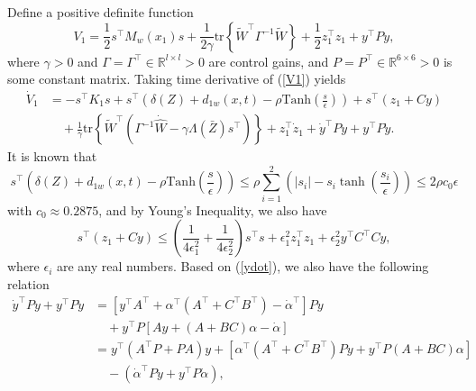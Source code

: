 \documentclass{article}
\newcommand{\tr}{\text{tr}}
\begin{document}
	Define a positive definite function
	\begin{equation}
	V_{1} = \frac{1}{2}s^{\top}M_{w}(x_{1})s + \frac{1}{2\gamma}\tr\left\{\tilde{W}^{\top}\Gamma^{-1}\tilde{W}\right\} + \frac{1}{2}z_{1}^{\top}z_{1} + y^{\top}Py, \label{V1}
	\end{equation}
	where $\gamma>0$ and $\Gamma = \Gamma^{\top}\in\mathbb{R}^{l\times l}>0$ are control gains, and $P=P^{\top}\in\mathbb{R}^{6\times 6}>0$ is some constant matrix. Taking time derivative of (\ref{V1}) yields
	\begin{align}
	\dot{V}_{1} &= -s^{\top}K_{1}s + s^{\top}\left(\delta\left(Z\right)+d_{1w}(x,t) - \rho\text{Tanh}\left(\frac{s}{\epsilon}\right)\right) + s^{\top}\left(z_{1}+Cy\right) \nonumber \\
	&\quad + \frac{1}{\gamma}\tr\left\{\tilde{W}^{\top}\left(\Gamma^{-1}\dot{\hat{W}}-\gamma\Lambda\left(\bar{Z}\right)s^{\top}\right)\right\} + z_{1}^{\top}\dot{z}_{1} + \dot{y}^{\top}Py + y^{\top}P\dot{y}. \label{V1dot1}
	\end{align} 
	It is known that
	\begin{equation}
	s^{\top}\left(\delta\left(Z\right)+d_{1w}(x,t) - \rho\text{Tanh}\left(\frac{s}{\epsilon}\right)\right) \leq \rho\sum_{i=1}^{2}\left(\left\vert s_{i}\right\vert - s_{i}\tanh\left(\frac{s_{i}}{\epsilon}\right)\right) \leq 2\rho c_{0}\epsilon \label{ineq1}
	\end{equation}
	with $c_{0}\approx 0.2875$, and by Young's Inequality, we also have
	\begin{equation}
	s^{\top}\left(z_{1}+Cy\right) \leq \left(\frac{1}{4\epsilon_{1}^{2}} +\frac{1}{4\epsilon_{2}^{2}}\right)s^{\top}s + \epsilon_{1}^{2}z_{1}^{\top}z_{1} + \epsilon_{2}^{2}y^{\top}C^{\top}Cy, \label{ineq2} 
	\end{equation}
	where $\epsilon_{i}$ are any real numbers. Based on (\ref{ydot}), we also have the following relation
	\begin{align}
	\dot{y}^{\top}Py + y^{\top}P\dot{y} &= \left[y^{\top}A^{\top} + \alpha^{\top}\left(A^{\top}+C^{\top}B^{\top}\right) - \dot{\alpha}^{\top}\right]Py \nonumber \\
	& \quad + y^{\top}P\left[Ay+\left(A+BC\right)\alpha-\dot{\alpha}\right] \nonumber \\
	& = y^{\top}\left(A^{\top}P+PA\right)y + \left[\alpha^{\top}\left(A^{\top}+C^{\top}B^{\top}\right)Py + y^{\top}P\left(A+BC\right)\alpha\right] \nonumber \\
	& \quad -\left(\dot{\alpha}^{\top}Py+y^{\top}P\dot{\alpha}\right), \label{yPy}
	\end{align}
\end{document}
